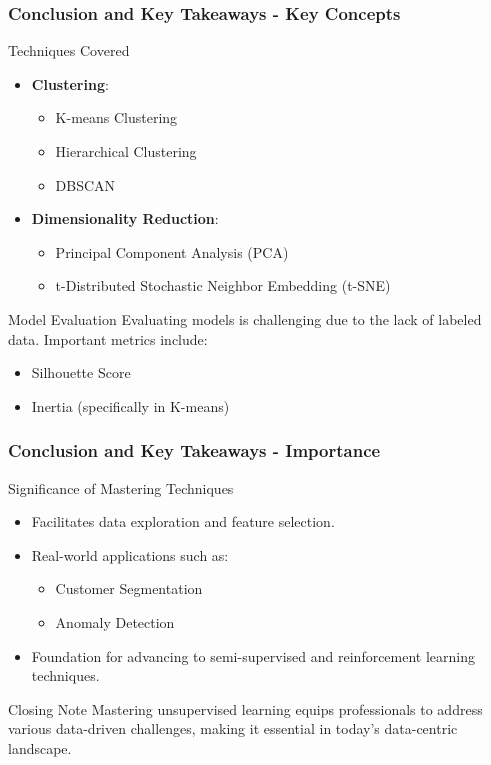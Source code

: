 \documentclass[aspectratio=169]{beamer}
\begin{document}
\begin{frame}[fragile]
    \frametitle{Conclusion and Key Takeaways - Key Concepts}
    \begin{block}{Techniques Covered}
        \begin{itemize}
            \item \textbf{Clustering}:
            \begin{itemize}
                \item K-means Clustering
                \item Hierarchical Clustering
                \item DBSCAN
            \end{itemize}
            \item \textbf{Dimensionality Reduction}:
            \begin{itemize}
                \item Principal Component Analysis (PCA)
                \item t-Distributed Stochastic Neighbor Embedding (t-SNE)
            \end{itemize}
        \end{itemize}
    \end{block}
    
    \begin{block}{Model Evaluation}
        Evaluating models is challenging due to the lack of labeled data. Important metrics include:
        \begin{itemize}
            \item Silhouette Score
            \item Inertia (specifically in K-means)
        \end{itemize}
    \end{block}
\end{frame}

\begin{frame}[fragile]
    \frametitle{Conclusion and Key Takeaways - Importance}
    \begin{block}{Significance of Mastering Techniques}
        \begin{itemize}
            \item Facilitates data exploration and feature selection.
            \item Real-world applications such as:
            \begin{itemize}
                \item Customer Segmentation
                \item Anomaly Detection
            \end{itemize}
            \item Foundation for advancing to semi-supervised and reinforcement learning techniques.
        \end{itemize}
    \end{block}

    \begin{block}{Closing Note}
        Mastering unsupervised learning equips professionals to address various data-driven challenges, making it essential in today's data-centric landscape. 
    \end{block}
\end{frame}
\end{document}
